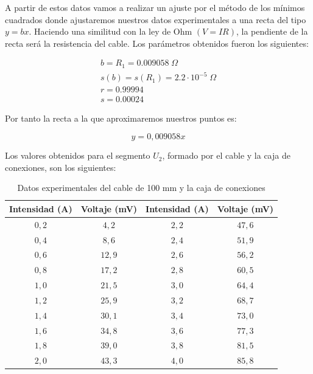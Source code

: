 \documentclass[a4paper,12pt,titlepage]{report}
\begin{document}
A partir de estos datos vamos a realizar un ajuste por el método de los mínimos cuadrados donde ajustaremos nuestros datos experimentales a una recta del tipo $y=bx$. Haciendo una similitud con la ley de Ohm $(V=IR)$, la pendiente de la recta será la resistencia del cable. Los parámetros obtenidos fueron los siguientes:

\begin{equation}
    \begin{gathered}
        b =R_{1}= 0.009058 \; \Omega 
        \\
        s(b) = s(R_{1})= 2.2 \cdot 10^{-5} \; \Omega
        \\
        r = 0.99994
        \\
        s = 0.00024
    \end{gathered}
\end{equation}

Por tanto la recta a la que aproximaremos nuestros puntos es:

\begin{equation}
    y = 0,009058x
\end{equation}

Los valores obtenidos para el segmento $U_{2}$, formado por el cable y la caja de conexiones, son los siguientes:

\begin{table}[h!]
    \centering
    \begin{tabular}{|c|c|c|c|}
        \hline
        Intensidad (A) & Voltaje (mV) & Intensidad (A) & Voltaje (mV) \\
        \hline
        $0,2$ & $4,2$ & $2,2$ & $47,6$ \\
        \hline
        $0,4$ & $8,6$ & $2,4$ & $51,9$ \\
        \hline
        $0,6$ & $12,9$ & $2,6$ & $56,2$ \\ 
        \hline
        $0,8$ & $17,2$ & $2,8$ & $60,5$ \\
        \hline
        $1,0$ & $21,5$ & $3,0$ & $64,4$ \\
        \hline
        $1,2$ & $25,9$ & $3,2$ & $68,7$ \\
        \hline
        $1,4$ & $30,1$ & $3,4$ & $73,0$ \\ 
        \hline
        $1,6$ & $34,8$ & $3,6$ & $77,3$ \\
        \hline
        $1,8$ & $39,0$ & $3,8$ & $81,5$ \\
        \hline
        $2,0$ & $43,3$ & $4,0$ & $85,8$ \\ 
        \hline
    \end{tabular}
    \caption{Datos experimentales del cable de 100 mm y la caja de conexiones}
\end{table}
\end{document}
